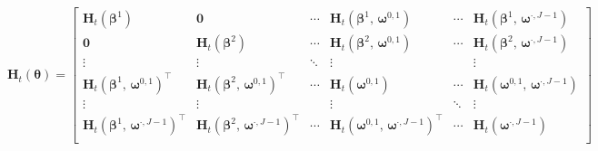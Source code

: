 \documentclass[12pt]{article}
\newcommand{\bw}[1]{\boldsymbol{\omega}^{#1}}
\newcommand{\Ht}[1]{\mathbf{H}_{t}(#1)}
\begin{document}
\begin{equation} \label{eq:FullHessian}
  \Ht{\boldsymbol{\theta}} =  \begin{bmatrix}
  \Ht{\boldsymbol{\beta}^{1}}                                               & \boldsymbol{0}                                                           & \cdots & \Ht{ \boldsymbol{\beta}^{1}, \,  \bw{0, 1} }                & \cdots & \Ht{ \boldsymbol{\beta}^{1}, \,  \bw{\boldsymbol{\cdot}, J - 1} }  \\
  \boldsymbol{0}                                                            & \Ht{\boldsymbol{\beta}^{2}}                                              & \cdots & \Ht{\boldsymbol{\beta}^{2}, \, \bw{0, 1}}                   & \cdots & \Ht{\boldsymbol{\beta}^{2}, \, \bw{\boldsymbol{\cdot}, J - 1}}     \\
  \vdots                                                                    & \vdots                                                                   & \ddots & \vdots                                                      &        & \vdots                                                             \\
  \Ht{ \boldsymbol{\beta}^{1}, \,  \bw{0, 1} }^{\top}                       & \Ht{ \boldsymbol{\beta}^{2}, \,  \bw{0, 1} }^{\top}                      & \cdots & \Ht{\bw{0, 1}}                                              & \cdots & \Ht{\bw{0, 1}, \, \bw{\boldsymbol{\cdot}, J - 1} }                 \\
  \vdots                                                                    & \vdots                                                                   &        & \vdots                                                      & \ddots & \vdots                                                             \\
  \Ht{ \boldsymbol{\beta}^{1}, \,  \bw{\boldsymbol{\cdot}, J - 1} }^{\top}  & \Ht{ \boldsymbol{\beta}^{2}, \,  \bw{\boldsymbol{\cdot}, J - 1} }^{\top} & \cdots & \Ht{ \bw{0, 1}, \,  \bw{\boldsymbol{\cdot}, J - 1} }^{\top} & \cdots & \Ht{ \bw{\boldsymbol{\cdot}, J - 1}}                               \\
    \end{bmatrix}
\end{equation}
\end{document}

